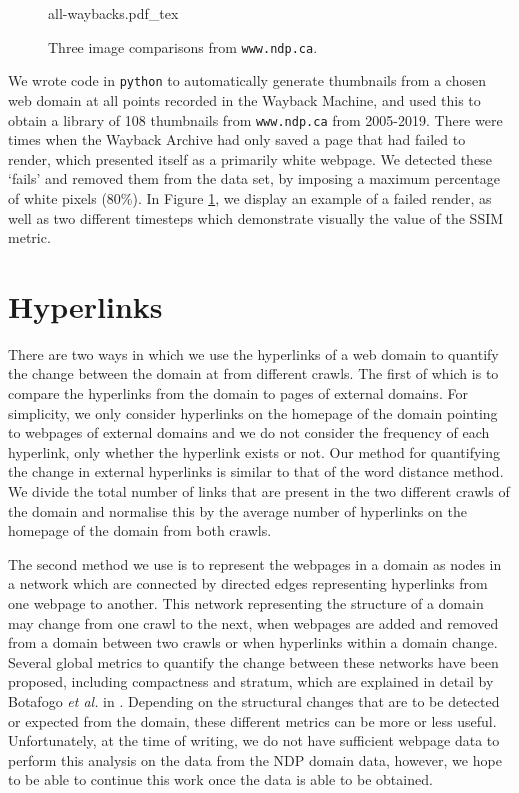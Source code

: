 \documentclass[10pt, a4paper]{article}
\begin{document}
\begin{figure}[h!]
\centering
\def\svgwidth{
0.7\columnwidth}
{all-waybacks.pdf_tex}
  \caption{Three image comparisons from \texttt{www.ndp.ca}.}
\label{fig::wayback_images}
\end{figure}

We wrote code in \texttt{python} to automatically generate thumbnails from a chosen web domain at all points recorded in the Wayback Machine, and used this to obtain a library of 108 thumbnails from \texttt{www.ndp.ca} from 2005-2019. There were times when the Wayback Archive had only saved a page that had failed to render, which presented itself as a primarily white webpage. We detected these `fails' and removed them from the data set, by imposing a maximum percentage of white pixels (80\%). In Figure \ref{fig::wayback_images}, we display an example of a failed render, as well as two different timesteps which demonstrate visually the value of the SSIM metric.
\vspace{-3mm}

\section{Hyperlinks}
\vspace{-2mm}
 There are two ways in which we use the hyperlinks of a web domain to quantify the change between the domain at from different crawls.
 The first of which is to compare the hyperlinks from the domain to pages of external domains.
 For simplicity, we only consider hyperlinks on the homepage of the domain pointing to webpages of external domains and we do not consider the frequency of each hyperlink, only whether the hyperlink exists or not.
 Our method for quantifying the change in external hyperlinks is similar to that of the word distance method.
 We divide the total number of links that are present in the two different crawls of the domain and normalise this by the average number of hyperlinks on the homepage of the domain from both crawls.
 
 The second method we use is to represent the webpages in a domain as nodes in a network which are connected by directed edges representing hyperlinks from one webpage to another.
 This network representing the structure of a domain may change from one crawl to the next, when webpages are added and removed from a domain between two crawls or when hyperlinks within a domain change.
 Several global metrics to quantify the change between these networks have been proposed, including compactness and stratum, which are explained in detail by Botafogo \textit{et al.} in \cite{botafogo1992structural}.
 Depending on the structural changes that are to be detected or expected from the domain, these different metrics can be more or less useful.
 Unfortunately, at the time of writing, we do not have sufficient webpage data to perform this analysis on the data from the NDP domain data, however, we hope to be able to continue this work once the data is able to be obtained.
\vspace{-3mm}
\end{document}
